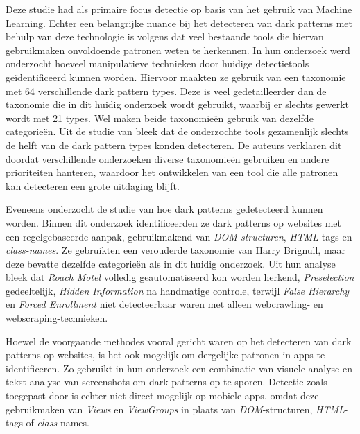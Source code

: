 Deze studie had als primaire focus detectie op basis van het gebruik van Machine Learning. Echter een belangrijke nuance bij het detecteren van dark patterns met behulp van deze technologie is volgens \textcite{Nie2024} dat veel bestaande tools die hiervan gebruikmaken onvoldoende patronen weten te herkennen. In hun onderzoek werd onderzocht hoeveel manipulatieve technieken door huidige detectietools geïdentificeerd kunnen worden. Hiervoor maakten ze gebruik van een taxonomie met 64 verschillende dark pattern types. Deze is veel gedetailleerder dan de taxonomie die in dit huidig onderzoek wordt gebruikt, waarbij er slechts gewerkt wordt met 21 types. Wel maken beide taxonomieën gebruik van dezelfde categorieën. Uit de studie van \textcite{Nie2024} bleek dat de onderzochte tools gezamenlijk slechts de helft van de dark pattern types konden detecteren. De auteurs verklaren dit doordat verschillende onderzoeken diverse taxonomieën gebruiken en andere prioriteiten hanteren, waardoor het ontwikkelen van een tool die alle patronen kan detecteren een grote uitdaging blijft.

\vspace{1em}

Eveneens onderzocht de studie van \textcite{Stavrakakis2021} hoe dark patterns gedetecteerd kunnen worden. Binnen dit onderzoek identificeerden ze dark patterns op websites met een regelgebaseerde aanpak, gebruikmakend van \textit{DOM-structuren}, \textit{HTML}-tags en \textit{class-names}. Ze gebruikten een verouderde taxonomie van Harry Brignull, maar deze bevatte dezelfde categorieën als in dit huidig onderzoek. Uit hun analyse bleek dat \textit{Roach Motel} volledig geautomatiseerd kon worden herkend, \textit{Preselection} gedeeltelijk, \textit{Hidden Information} na handmatige controle, terwijl \textit{False Hierarchy} en \textit{Forced Enrollment} niet detecteerbaar waren met alleen webcrawling- en webscraping-technieken.

\vspace{1em}

Hoewel de voorgaande methodes vooral gericht waren op het detecteren van dark patterns op websites, is het ook mogelijk om dergelijke patronen in apps te identificeren. Zo gebruikt \textcite{Mansur2023} in hun onderzoek een combinatie van visuele analyse en tekst-analyse van screenshots om dark patterns op te sporen. Detectie zoals toegepast door \textcite{Stavrakakis2021} is echter niet direct mogelijk op mobiele apps, omdat deze gebruikmaken van \textit{Views} en \textit{ViewGroups} \autocite{AndroidUILayout2026} in plaats van \textit{DOM}-structuren, \textit{HTML}-tags of \textit{class}-names.

